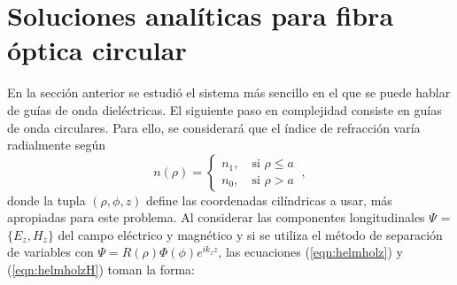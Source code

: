 \section{Soluciones analíticas para fibra óptica circular}
En la sección anterior se estudió el sistema más sencillo en el que se puede hablar de guías de onda dieléctricas. El siguiente paso en complejidad consiste en guías de onda circulares. Para ello, se considerará que el índice de refracción varía radialmente según 
\begin{equation}
	n( \rho ) = 
	\left\{\begin{matrix}
	n_1, \quad \text{si } \rho \le a
	\\
	n_0, \quad \text{si } \rho > a
	\end{matrix}\right.
	\ ,\nonumber
\end{equation}
donde la tupla $(\rho, \phi, z)$ define las coordenadas cilíndricas a usar, más apropiadas para este problema. 
Al considerar las componentes longitudinales $\Psi$ = $\{E_z, H_z\}$ del campo eléctrico y magnético y  si se utiliza el método de separación de variables con $\Psi =  R(\rho)\Phi(\phi) e^{ik_z z} $,  las ecuaciones (\ref{eqn:helmholz}) y (\ref{eqn:helmholzH}) toman la forma:


